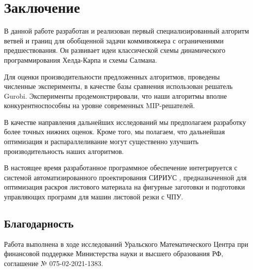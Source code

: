 \section{Заключение}\label{sec:summary}

В данной работе
разработан и реализован
первый специализированный алгоритм
ветвей и границ
для обобщенной задачи коммивояжера
с ограничениями предшествования.
Он развивает идеи классической схемы
динамического программирования
Хелда-Карпа
и схемы Салмана.

Для оценки производительности
предложенных алгоритмов,
проведены численные эксперименты,
в качестве базы сравнения использован
решатель Gurobi.
Эксперименты продемонстрировали,
что наши алгоритмы
вполне конкурентноспособны на уровне
современных MIP-решателей.

В качестве направления дальнейших исследований
мы предполагаем разработку более
точных нижних оценок.
Кроме того,
мы полагаем,
что дальнейшая оптимизация
и распараллеливание
могут существенно улучшить производительность
наших алгоритмов.

В настоящее время разработанное программное обеспечение
интегрируется с системой автоматизированного проектирования СИРИУС
\cite{bi:Sirius},
предназначенной для оптимизация раскроя
листового материала на фигурные заготовки
и подготовки управляющих программ
для машин листовой резки с ЧПУ.

\subsection*{Благодарность}

Работа выполнена
в ходе исследований
Уральского Математического Центра
при финансовой поддержке Министерства науки и высшего образования РФ,
соглашение № 075-02-2021-1383.

